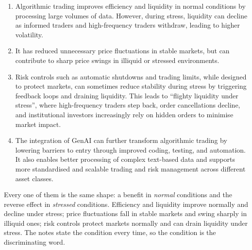 \begin{enumerate}
\item {} Algorithmic trading improves efficiency and
liquidity in normal conditions by processing large volumes of data. However, during stress,
liquidity can decline as informed traders and high-frequency traders withdraw, leading to
higher volatility.
\item {} It has reduced unnecessary price fluctuations in stable
markets, but can contribute to sharp price swings in illiquid or stressed environments.
\item {} Risk controls such as automatic shutdowns and
trading limits, while designed to protect markets, can sometimes reduce stability during
stress by triggering feedback loops and draining liquidity. This leads to ``flighty
liquidity under stress'', where high-frequency traders step back, order cancellations
decline, and institutional investors increasingly rely on hidden orders to minimise market
impact.
\item {} The integration of GenAI can further transform algorithmic
trading by lowering barriers to entry through improved coding, testing, and automation. It
also enables better processing of complex text-based data and supports more standardised and
scalable trading and risk management across different asset classes.
\end{enumerate}

\begin{citrapbox}[title={Direction matters in all four of the points above}]
Every one of them is the same shape: a benefit in \emph{normal} conditions and the reverse
effect in \emph{stressed} conditions. Efficiency and liquidity improve normally and decline
under stress; price fluctuations fall in stable markets and swing sharply in illiquid ones;
risk controls protect markets normally and can drain liquidity under stress. The notes state
the condition every time, so the condition is the discriminating word.
\end{citrapbox}

